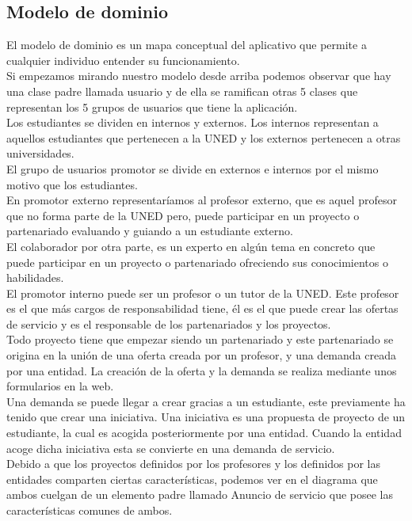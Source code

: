 \documentclass{article}
\begin{document}
\subsection{Modelo de dominio}
El modelo de dominio es un mapa conceptual del aplicativo que permite a cualquier individuo entender su funcionamiento.\\
Si empezamos mirando nuestro modelo desde arriba podemos observar que hay una clase padre llamada usuario y de ella se ramifican otras 5 clases que representan los 5 grupos de usuarios que tiene la aplicación.\\
Los estudiantes se dividen en internos y externos. Los internos representan a aquellos estudiantes que pertenecen a la UNED y los externos pertenecen a otras universidades.\\
El grupo de usuarios promotor se divide en externos e internos por el mismo motivo que los estudiantes. \\
En promotor externo representaríamos al profesor externo, que es aquel profesor que no forma parte de la UNED pero, puede participar en un proyecto o partenariado evaluando y guiando a un estudiante externo. \\
El colaborador por otra parte, es un experto en algún tema en concreto que puede participar en un proyecto o partenariado ofreciendo sus conocimientos o habilidades.\\
El promotor interno puede ser un profesor o un tutor de la UNED. Este profesor es el que más cargos de responsabilidad tiene, él es el que puede crear las ofertas de servicio y es el responsable de los partenariados y los proyectos.\\
Todo proyecto tiene que empezar siendo un partenariado y este partenariado se origina en la unión de una oferta creada por un profesor, y una demanda creada por una entidad. La creación de la oferta y la demanda se realiza mediante unos formularios en la web.\\
Una demanda se puede llegar a crear gracias a un estudiante, este previamente ha tenido que crear una iniciativa. Una iniciativa es una propuesta de proyecto de un estudiante, la cual es acogida posteriormente por una entidad. Cuando la entidad acoge dicha iniciativa esta se convierte en una demanda de servicio.\\ 
Debido a que los proyectos definidos por los profesores y los definidos por las entidades comparten ciertas características, podemos ver en el diagrama que ambos cuelgan de un elemento padre llamado Anuncio de servicio que posee las características comunes de ambos.
\end{document}
